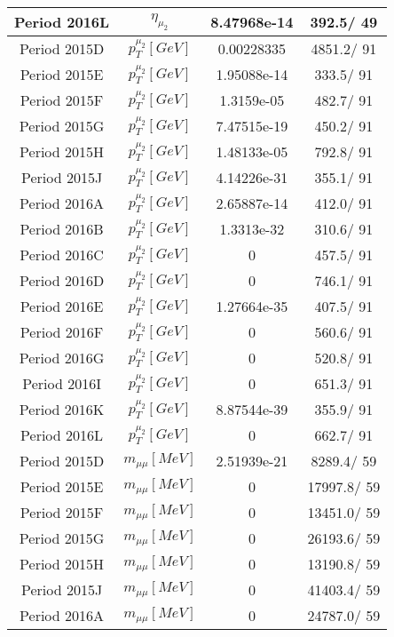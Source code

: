 \documentclass{article}
\begin{document}
\begin{longtable}{c|c|c|c}
\hline
 Period 2016L & $\eta_{\mu_{2}}$ & 8.47968e-14 & 392.5/ 49\\
\hline
 Period 2015D & $p_{T}^{\mu_{2}} [GeV]$ & 0.00228335 & 4851.2/ 91\\
\hline
 Period 2015E & $p_{T}^{\mu_{2}} [GeV]$ & 1.95088e-14 & 333.5/ 91\\
\hline
 Period 2015F & $p_{T}^{\mu_{2}} [GeV]$ & 1.3159e-05 & 482.7/ 91\\
\hline
 Period 2015G & $p_{T}^{\mu_{2}} [GeV]$ & 7.47515e-19 & 450.2/ 91\\
\hline
 Period 2015H & $p_{T}^{\mu_{2}} [GeV]$ & 1.48133e-05 & 792.8/ 91\\
\hline
 Period 2015J & $p_{T}^{\mu_{2}} [GeV]$ & 4.14226e-31 & 355.1/ 91\\
\hline
 Period 2016A & $p_{T}^{\mu_{2}} [GeV]$ & 2.65887e-14 & 412.0/ 91\\
\hline
 Period 2016B & $p_{T}^{\mu_{2}} [GeV]$ & 1.3313e-32 & 310.6/ 91\\
\hline
 Period 2016C & $p_{T}^{\mu_{2}} [GeV]$ & 0 & 457.5/ 91\\
\hline
 Period 2016D & $p_{T}^{\mu_{2}} [GeV]$ & 0 & 746.1/ 91\\
\hline
 Period 2016E & $p_{T}^{\mu_{2}} [GeV]$ & 1.27664e-35 & 407.5/ 91\\
\hline
 Period 2016F & $p_{T}^{\mu_{2}} [GeV]$ & 0 & 560.6/ 91\\
\hline
 Period 2016G & $p_{T}^{\mu_{2}} [GeV]$ & 0 & 520.8/ 91\\
\hline
 Period 2016I & $p_{T}^{\mu_{2}} [GeV]$ & 0 & 651.3/ 91\\
\hline
 Period 2016K & $p_{T}^{\mu_{2}} [GeV]$ & 8.87544e-39 & 355.9/ 91\\
\hline
 Period 2016L & $p_{T}^{\mu_{2}} [GeV]$ & 0 & 662.7/ 91\\
\hline
 Period 2015D & $m_{\mu\mu} [MeV]$ & 2.51939e-21 & 8289.4/ 59\\
\hline
 Period 2015E & $m_{\mu\mu} [MeV]$ & 0 & 17997.8/ 59\\
\hline
 Period 2015F & $m_{\mu\mu} [MeV]$ & 0 & 13451.0/ 59\\
\hline
 Period 2015G & $m_{\mu\mu} [MeV]$ & 0 & 26193.6/ 59\\
\hline
 Period 2015H & $m_{\mu\mu} [MeV]$ & 0 & 13190.8/ 59\\
\hline
 Period 2015J & $m_{\mu\mu} [MeV]$ & 0 & 41403.4/ 59\\
\hline
 Period 2016A & $m_{\mu\mu} [MeV]$ & 0 & 24787.0/ 59\\

\end{longtable}
\end{document}
